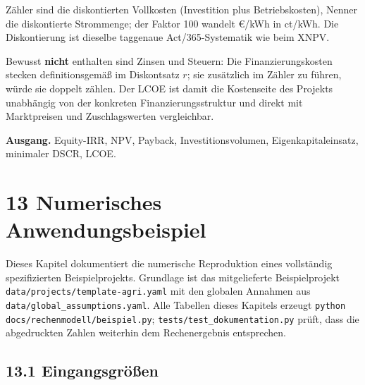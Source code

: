 \documentclass[
  a4paper,
  10pt]{article}
\begin{document}
Zähler sind die diskontierten Vollkosten (Investition plus
Betriebskosten), Nenner die diskontierte Strommenge; der Faktor 100
wandelt €/kWh in ct/kWh. Die Diskontierung ist dieselbe taggenaue
Act/365-Systematik wie beim XNPV.

Bewusst \textbf{nicht} enthalten sind Zinsen und Steuern: Die
Finanzierungskosten stecken definitionsgemäß im Diskontsatz \(r\); sie
zusätzlich im Zähler zu führen, würde sie doppelt zählen. Der LCOE ist
damit die Kostenseite des Projekts unabhängig von der konkreten
Finanzierungsstruktur und direkt mit Marktpreisen und Zuschlagswerten
vergleichbar.

\textbf{Ausgang.} Equity-IRR, NPV, Payback, Investitionsvolumen,
Eigenkapitaleinsatz, minimaler DSCR, LCOE.

\hypertarget{numerisches-anwendungsbeispiel}{%
\section{13 Numerisches
Anwendungsbeispiel}\label{numerisches-anwendungsbeispiel}}

Dieses Kapitel dokumentiert die numerische Reproduktion eines
vollständig spezifizierten Beispielprojekts. Grundlage ist das
mitgelieferte Beispielprojekt \nolinkurl{data/projects/template-agri.yaml}
mit den globalen Annahmen aus \nolinkurl{data/global_assumptions.yaml}.
Alle Tabellen dieses Kapitels erzeugt
\texttt{python }\nolinkurl{docs/rechenmodell/beispiel.py};
\nolinkurl{tests/test_dokumentation.py} prüft, dass die abgedruckten
Zahlen weiterhin dem Rechenergebnis entsprechen.

\hypertarget{eingangsgruxf6uxdfen}{%
\subsection{13.1 Eingangsgrößen}\label{eingangsgruxf6uxdfen}}
\end{document}
